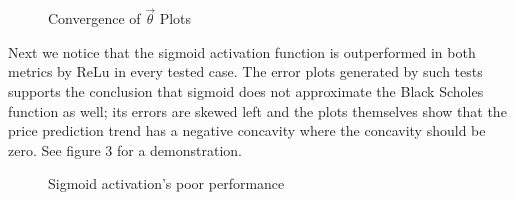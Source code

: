 \documentclass[reqno,14pt]{amsart}
\theoremstyle{plain}
\theoremstyle{definition}
\theoremstyle{remark}
\begin{document}
\begin{figure} [!tbp]
  \centering
  \hfill
  \caption{Convergence of $\overrightarrow{\theta}$ Plots}
\end{figure}

Next we notice that the sigmoid activation function is outperformed in both metrics by ReLu in every tested case. The error plots generated by such tests supports the conclusion that sigmoid does not approximate the Black Scholes function as well; its errors are skewed left and the plots themselves show that the price prediction trend has a negative concavity where the concavity should be zero. See figure 3 for a demonstration.\\ 

\begin{figure} [!tbp]
  \centering
  \hfill
  \caption{Sigmoid activation's poor performance}
\end{figure}
\end{document}
